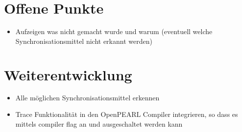 \section{Offene Punkte}
\begin{itemize}
  \item Aufzeigen was nicht gemacht wurde und warum (eventuell welche
  Synchronisationsmittel nicht erkannt werden)
\end{itemize}

\section{Weiterentwicklung}
\begin{itemize}
  \item Alle möglichen Synchronisationsmittel erkennen
  \item Trace Funktionalität in den OpenPEARL Compiler integrieren, so dass es
  mittels compiler flag an und ausgeschaltet werden kann
\end{itemize}